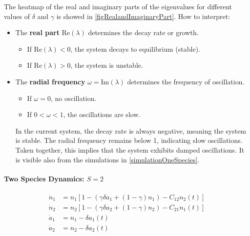 \documentclass[11pt,a4paper,fleqn]{scrartcl}
\begin{document}
The heatmap of the real and imaginary parts of the eigenvalues for different values of $\delta$ and $\gamma$ is showed in \ref{figRealandImaginaryPart}.
How to interpret:
\begin{itemize}
    \item The \textbf{real part} $\text{Re}(\lambda)$ determines the decay rate or growth.
        \begin{itemize}
            \item If $\text{Re}(\lambda) < 0$, the system decays to equilibrium (stable).
            \item If $\text{Re}(\lambda) > 0$, the system is unstable.
        \end{itemize}
    \item The \textbf{radial frequency} $\omega = \text{Im}(\lambda)$ determines the frequency of oscillation.
        \begin{itemize}
            \item If $\omega = 0$, no oscillation.
            \item If $0 < \omega < 1$, the oscillations are slow.
        \end{itemize}
In the current system, the decay rate is always negative, meaning the system is stable. The radial frequency remains below 1, indicating slow oscillations. Taken together, this implies that the system exhibits damped oscillations. It is visible also from the simulations in \ref{simulationOneSpecies}.
\end{itemize}


\paragraph{Two Species Dynamics: $S=2$}

\begin{align}
\dot{n}_1 &= n_1 \left[ 1 - \left( \gamma \delta a_1 + (1 - \gamma) n_1 \right) - C_{12} n_2(t) \right] \tag{Species 1} \\
\dot{n}_2 &= n_2\left[ 1 - \left( \gamma \delta a_2 + (1 - \gamma) n_2 \right) - C_{21} n_1(t) \right] \tag{Species 2} \\
\dot{a}_1 &= n_1 - \delta a_1(t) \tag{Autotoxin 1} \\
\dot{a}_2 &= n_2 - \delta a_2(t) \tag{Autotoxin 2}
\end{align}
\end{document}
